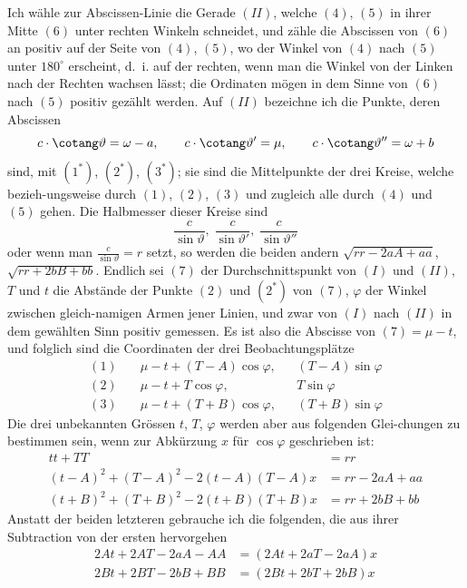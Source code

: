 \documentclass[12pt,a4paper]{article}
\begin{document}
Ich w\"ahle zur Abscissen-Linie die Gerade $(II)$, welche $(4)$, $(5)$ in ihrer Mitte
$(6)$ unter rechten Winkeln schneidet, und z\"ahle die Abscissen von $(6)$ an positiv
auf der Seite von $(4)$, $(5)$, wo der Winkel von $(4)$ nach $(5)$ unter $180^\circ$ erscheint,
d.~i. auf der rechten, wenn man die Winkel von der Linken nach der Rechten
wachsen l\"asst; die Ordinaten m\"ogen in dem Sinne von $(6)$ nach $(5)$ positiv gez\"ahlt
werden. Auf $(II)$ bezeichne ich die Punkte, deren Abscissen
\[
c \cdot \cotang\vartheta = \omega - a,\qquad c \cdot \cotang\vartheta' = \mu,\qquad c \cdot \cotang\vartheta'' = \omega + b
\]
sind, mit $(1^*)$, $(2^*)$, $(3^*)$; sie sind die Mittelpunkte der drei Kreise, welche bezieh-\/ungsweise durch $(1)$, $(2)$, $(3)$ und zugleich alle durch $(4)$ und $(5)$ gehen. Die
Halbmesser dieser Kreise sind
\[
\frac{c}{\sin\vartheta},\; \frac{c}{\sin\vartheta'},\; \frac{c}{\sin\vartheta''}
\]
oder wenn man $\frac{c}{\sin\vartheta} = r$ setzt, so werden die beiden andern $\sqrt{rr - 2aA + aa}$,
$\sqrt{rr + 2bB + bb}$. Endlich sei $(7)$ der Durchschnittspunkt von $(I)$ und $(II)$, $T$
und $t$ die Abst\"ande der Punkte $(2)$ und $(2^*)$ von $(7)$, $\varphi$ der Winkel zwischen gleich-\/namigen Armen jener Linien, und zwar von $(I)$ nach $(II)$ in dem gew\"ahlten Sinn
positiv gemessen. Es ist also die Abscisse von $(7) = \mu - t$, und folglich sind
die Coordinaten der drei Beobachtungspl\"atze
\begin{align*}
(1)\quad & \mu - t + (T-A)\cos\varphi, && (T-A)\sin\varphi \\
(2)\quad & \mu - t + T\cos\varphi, && T\sin\varphi \\
(3)\quad & \mu - t + (T+B)\cos\varphi, && (T+B)\sin\varphi
\end{align*}
Die drei unbekannten Gr\"ossen $t$, $T$, $\varphi$ werden aber aus folgenden Glei-\/chungen zu bestimmen sein, wenn zur Abk\"urzung $x$ f\"ur $\cos\varphi$ geschrieben ist:
\begin{align*}
tt + TT &= rr \tag{1} \\
(t-A)^2 + (T-A)^2 - 2(t-A)(T-A)x &= rr - 2aA + aa \tag{2} \\
(t+B)^2 + (T+B)^2 - 2(t+B)(T+B)x &= rr + 2bB + bb \tag{3}
\end{align*}
Anstatt der beiden letzteren gebrauche ich die folgenden, die aus ihrer Subtraction
von der ersten hervorgehen
\begin{align*}
2At + 2AT - 2aA - AA &= (2At + 2aT - 2aA)x \tag{[2]} \\
2Bt + 2BT - 2bB + BB &= (2Bt + 2bT + 2bB)x \tag{[3]}
\end{align*}
\end{document}

